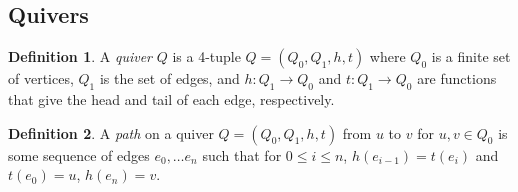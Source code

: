 \documentclass{amsart}
\theoremstyle{theorem}
\theoremstyle{theorem*}
\theoremstyle{definition}
\newtheorem{definition}{Definition}
\begin{document}
\subsection{Quivers}

\begin{definition} \cite{dw} A \textit{quiver} $Q$ is a 4-tuple $Q = (Q_0, Q_1,
        h, t)$ where $Q_0$ is a finite set of vertices, $Q_1$ is the set of
    edges, and $h: Q_1 \rightarrow Q_0$ and $t : Q_1 \rightarrow Q_0$ are
    functions that give the head and tail of each edge, respectively.
\end{definition}

\begin{definition} \cite{dw} A \textit{path} on a quiver $Q = (Q_0, Q_1, h, t)$
    from $u$ to $v$ for $u, v \in Q_0$ is some sequence of edges $e_0, \dots
        e_n$ such that for $0 \leq i \leq n$, $h(e_{i-1}) = t(e_i)$ and $t(e_0) =
        u$, $h(e_n) = v$.
\end{definition}
\end{document}

